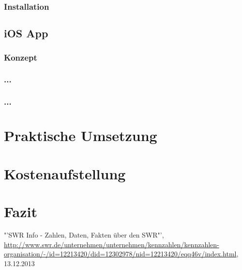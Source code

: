 \subsection{Installation}

\section{iOS App}
\subsection{Konzept}
\subsection{...}
\subsection{...}

\chapter{Praktische Umsetzung}

\chapter{Kostenaufstellung}

\chapter{Fazit}

\listoffigures

\begin{thebibliography}{xxxxxxxxxxxxxxxxxxx}
 "'SWR Info - Zahlen, Daten, Fakten über den SWR"', \url{http://www.swr.de/unternehmen/unternehmen/kennzahlen/kennzahlen-organisation/-/id=12213420/did=12302978/nid=12213420/eqq46v/index.html}, 13.12.2013
\end{thebibliography}

 

 